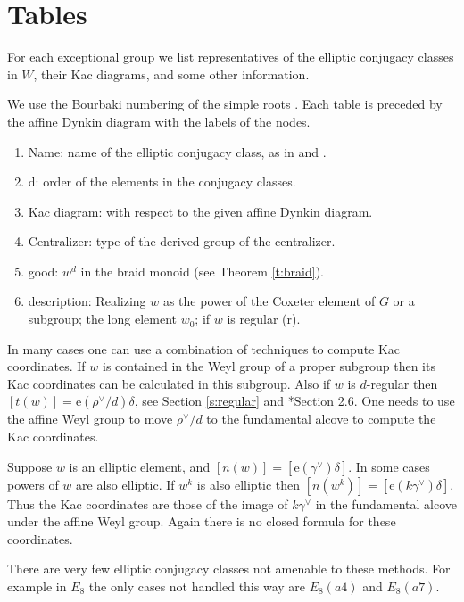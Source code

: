 \documentclass[10pt,leqno]{article}
\newcommand{\ch}[1]{#1^\vee}
\renewcommand{\sec}[1]{\section{#1}
\renewcommand{\theequation}{\thesection.\arabic{equation}}
  \setcounter{equation}{0}}
\newcommand{\e}{\text{e}}
\renewcommand{\sec}[1]{\section{#1}
\renewcommand{\theequation}{\thesection.\arabic{equation}}
  \setcounter{equation}{0}}
\begin{document}
\sec{Tables}
\label{s:tables}

For each exceptional group we list representatives of the elliptic conjugacy classes in $W$,
their Kac diagrams, and some other information.

We use the Bourbaki numbering of the simple roots \cite{bourbaki_4-6}.
Each table is preceded by the affine Dynkin diagram with the labels of the nodes.


\begin{enumerate}
\item Name: name of the elliptic conjugacy class, as in \cite{carter_conjugacy_classes} and \cite{geck_pfeiffer}.
\item d: order of the elements in the conjugacy classes.
\item Kac diagram: with respect to the given affine Dynkin diagram.
\item Centralizer: type of the derived group of the centralizer.
\item good: $w^d$ in the braid monoid (see Theorem \ref{t:braid}).
\item description: Realizing $w$ as the power of the Coxeter element of $G$ or a subgroup;
  the long element $w_0$;
if $w$ is regular (r).
\end{enumerate}

In many cases one can use a combination of techniques to compute Kac
coordinates.  If $w$ is contained in the Weyl group of a proper subgroup
then its Kac coordinates can
be calculated in this subgroup. 
Also if  $w$ is $d$-regular then $[t(w)]=\e(\ch\rho/d)\delta$, see Section
\ref{s:regular} and \cite{reeder_torsion}*{Section 2.6}.  
One needs to use the affine Weyl group to move $\ch\rho/d$ to the
fundamental alcove to compute the Kac coordinates.

Suppose $w$ is an elliptic element, and 
$[n(w)]=[\e(\ch\gamma)\delta]$. In some cases powers of $w$ are also elliptic. If  $w^k$ is also elliptic then
$[n(w^k)]=[\e(k\ch\gamma)\delta]$.  Thus the Kac coordinates are
those of the image of $k\ch\gamma$ in the fundamental alcove under the
affine Weyl group. Again there is no closed formula for these
coordinates.

There are very few elliptic conjugacy classes not amenable to these methods.
For example in $E_8$ the only cases not handled this way are 
$E_8(a4)$ and $E_8(a7)$. 
\end{document}
